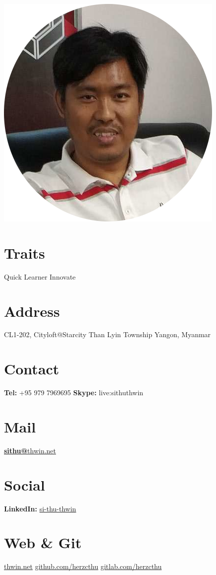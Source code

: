 \documentclass[]{friggeri-cv}
\begin{document}
\begin{aside}
  \includegraphics[scale=1]{img/myself-circle.png}
  \section{Traits}
    Quick Learner
    Innovate
  \section{Address}
    CL1-202, Cityloft@Starcity
    Than Lyin Township
    Yangon, Myanmar
    ~
  \section{Contact}
    \textbf{Tel:} +95 979 7969695
    \textbf{Skype:} live:sithuthwin
    ~
  \section{Mail}
    \href{mailto:sithu@thwin.net}{\textbf{sithu@}thwin.net}
    ~
  \section{Social}
    \textbf{LinkedIn:} \href{https://www.linkedin.com/in/si-thu-thwin/}{si-thu-thwin}
    ~
  \section{Web \& Git}
    \href{https://www.thwin.net}{thwin.net}
    \href{https://github.com/herzcthu}{github.com/herzcthu}
    \href{https://gitlab.com/herzcthu}{gitlab.com/herzcthu}
    ~

\end{aside}
\end{document}
